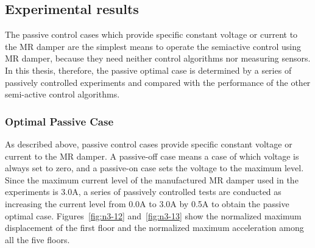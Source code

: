 
\subsection{Experimental results}
The passive control cases which provide specific constant voltage or current to the MR damper are the simplest means to operate the semiactive control using MR damper, because they need neither control algorithms nor measuring sensors. In this thesis, therefore, the passive optimal case is determined by a series of passively controlled experiments and compared with the performance of the other semi-active control algorithms.

\subsubsection{Optimal Passive Case}
As described above, passive control cases provide specific constant voltage or current to the MR damper. A passive-off case means a case of which voltage is always set to zero, and a passive-on case sets the voltage to the maximum level. Since the maximum current level of the manufactured MR damper used in the experiments is 3.0A, a series of passively controlled tests are conducted as increasing the current level from 0.0A to 3.0A by 0.5A to obtain the passive optimal case. Figures~\ref{fig:n3-12} and~\ref{fig:n3-13} show the normalized maximum displacement of the first floor and the normalized maximum acceleration among all the five floors. 

